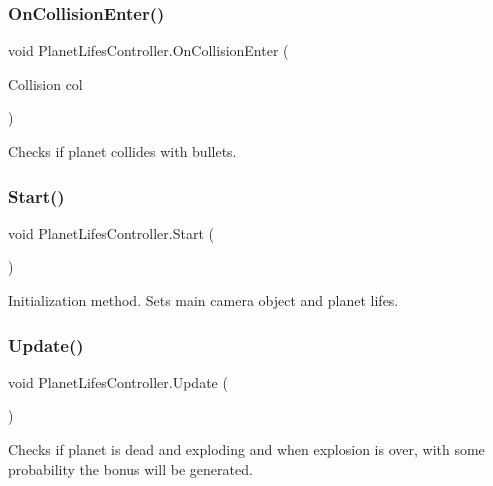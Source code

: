 \subsubsection{\texorpdfstring{On\+Collision\+Enter()}{OnCollisionEnter()}}
{\footnotesize\ttfamily void Planet\+Lifes\+Controller.\+On\+Collision\+Enter (\begin{DoxyParamCaption}\item[{Collision}]{col }\end{DoxyParamCaption})}



Checks if planet collides with bullets. 

\mbox{\label{class_planet_lifes_controller_acb812ee09ae6ed65b85baf971a582b25}} 
\subsubsection{\texorpdfstring{Start()}{Start()}}
{\footnotesize\ttfamily void Planet\+Lifes\+Controller.\+Start (\begin{DoxyParamCaption}{ }\end{DoxyParamCaption})}



Initialization method. Sets main camera object and planet lifes. 

\mbox{\label{class_planet_lifes_controller_a55a364780e2e20cb157170ce5c3b534c}} 
\subsubsection{\texorpdfstring{Update()}{Update()}}
{\footnotesize\ttfamily void Planet\+Lifes\+Controller.\+Update (\begin{DoxyParamCaption}{ }\end{DoxyParamCaption})\hspace{0.3cm}{\ttfamily [private]}}



Checks if planet is dead and exploding and when explosion is over, with some probability the bonus will be generated. 



